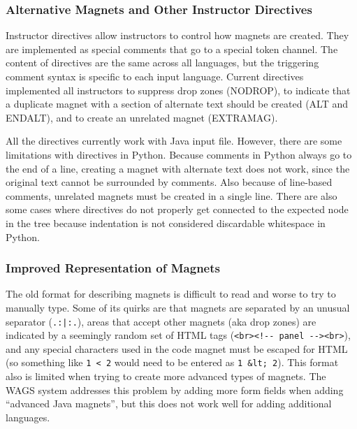 \documentclass[letter,10pt]{article}
\begin{document}
\subsubsection{Alternative Magnets and Other Instructor Directives}

Instructor directives allow instructors to control how magnets are 
created. They are implemented as special comments that go to a 
special token channel. The content of directives are the same across all 
languages, but the triggering comment syntax is specific to each input 
language. Current directives implemented all instructors to suppress 
drop zones (NODROP), to indicate that a duplicate magnet with a section 
of alternate text should be created (ALT and ENDALT), and to create an 
unrelated magnet (EXTRAMAG).

All the directives currently work with Java input file. However, there 
are some limitations with directives in Python. Because comments in 
Python always go to the end of a line, creating a magnet with alternate 
text does not work, since the original text cannot be surrounded by 
comments. Also because of line-based comments, unrelated magnets must 
be created in a single line. There are also some cases where directives 
do not properly get connected to the expected node in the tree because 
indentation is not considered discardable whitespace in Python.

\subsubsection{Improved Representation of Magnets}

The old format for describing magnets is difficult to read and worse to 
try to manually type. Some of its quirks are that magnets are separated 
by an unusual separator (\verb~.:|:.~), areas that accept other magnets 
(aka drop zones) are indicated by a seemingly random set of HTML tags 
(\verb~<br><!-- panel --><br>~), and any special characters used in the 
code magnet must be escaped for HTML (so something like \verb~1 < 2~ 
would need to be entered as \verb~1 &lt; 2~). This format also is 
limited when trying to create more advanced types of magnets. The WAGS 
system addresses this problem by adding more form fields when adding 
``advanced Java magnets'', but this does not work well for adding 
additional languages.
\end{document}
